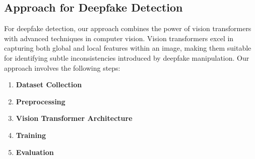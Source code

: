 \subsection{Approach for Deepfake Detection}

For deepfake detection, our approach combines the power of vision transformers with advanced techniques in computer vision. Vision transformers excel in capturing both global and local features within an image, making them suitable for identifying subtle inconsistencies introduced by deepfake manipulation.
\newpage
Our approach involves the following steps:
\vspace{0.2cm}
\begin{enumerate}
    \item \textbf{Dataset Collection}
    \item \textbf{Preprocessing}
    \item \textbf{Vision Transformer Architecture}
    \item \textbf{Training}
    \item \textbf{Evaluation}

\end{enumerate}





